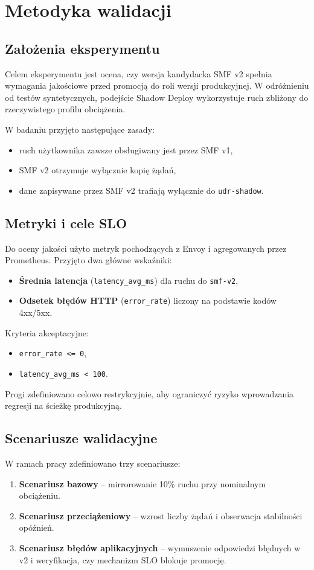 \chapter{Metodyka walidacji}

\section{Założenia eksperymentu}
Celem eksperymentu jest ocena, czy wersja kandydacka SMF v2 spełnia wymagania jakościowe przed promocją do roli wersji produkcyjnej. W odróżnieniu od testów syntetycznych, podejście Shadow Deploy wykorzystuje ruch zbliżony do rzeczywistego profilu obciążenia.

W badaniu przyjęto następujące zasady:
\begin{itemize}
    \item ruch użytkownika zawsze obsługiwany jest przez SMF v1,
    \item SMF v2 otrzymuje wyłącznie kopię żądań,
    \item dane zapisywane przez SMF v2 trafiają wyłącznie do \texttt{udr-shadow}.
\end{itemize}

\section{Metryki i cele SLO}
Do oceny jakości użyto metryk pochodzących z Envoy i agregowanych przez Prometheus. Przyjęto dwa główne wskaźniki:
\begin{itemize}
    \item \textbf{Średnia latencja} (\texttt{latency\_avg\_ms}) dla ruchu do \texttt{smf-v2},
    \item \textbf{Odsetek błędów HTTP} (\texttt{error\_rate}) liczony na podstawie kodów 4xx/5xx.
\end{itemize}

Kryteria akceptacyjne:
\begin{itemize}
    \item \texttt{error\_rate <= 0},
    \item \texttt{latency\_avg\_ms < 100}.
\end{itemize}

Progi zdefiniowano celowo restrykcyjnie, aby ograniczyć ryzyko wprowadzania regresji na ścieżkę produkcyjną.

\section{Scenariusze walidacyjne}
W ramach pracy zdefiniowano trzy scenariusze:
\begin{enumerate}
    \item \textbf{Scenariusz bazowy} -- mirrorowanie 10\% ruchu przy nominalnym obciążeniu.
    \item \textbf{Scenariusz przeciążeniowy} -- wzrost liczby żądań i obserwacja stabilności opóźnień.
    \item \textbf{Scenariusz błędów aplikacyjnych} -- wymuszenie odpowiedzi błędnych w v2 i weryfikacja, czy mechanizm SLO blokuje promocję.
\end{enumerate}

